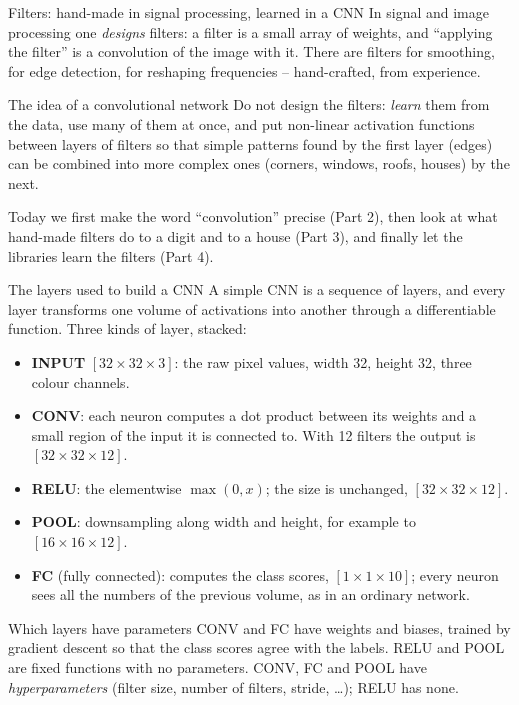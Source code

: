 \documentclass[10pt,aspectratio=169]{beamer}
\begin{document}
\begin{frame}{Filters: hand-made in signal processing, learned in a CNN}
\small
In signal and image processing one \emph{designs} filters: a filter is a
small array of weights, and ``applying the filter'' is a convolution of the
image with it.  There are filters for smoothing, for edge detection, for
reshaping frequencies -- hand-crafted, from experience.

\medskip
\begin{block}{The idea of a convolutional network}
Do not design the filters: \emph{learn} them from the data, use many of
them at once, and put non-linear activation functions between layers of
filters so that simple patterns found by the first layer (edges) can be
combined into more complex ones (corners, windows, roofs, houses) by the
next.
\end{block}

\medskip
Today we first make the word ``convolution'' precise (Part 2), then look at
what hand-made filters do to a digit and to a house (Part 3), and finally
let the libraries learn the filters (Part 4).
\end{frame}

\begin{frame}{The layers used to build a CNN}
\small
A simple CNN is a sequence of layers, and every layer transforms one volume
of activations into another through a differentiable function.  Three kinds
of layer, stacked:
\begin{itemize}
  \item \textbf{INPUT} $[32\times32\times3]$: the raw pixel values, width
        32, height 32, three colour channels.
  \item \textbf{CONV}: each neuron computes a dot product between its
        weights and a small region of the input it is connected to.  With
        12 filters the output is $[32\times32\times12]$.
  \item \textbf{RELU}: the elementwise $\max(0,x)$; the size is unchanged,
        $[32\times32\times12]$.
  \item \textbf{POOL}: downsampling along width and height, for example to
        $[16\times16\times12]$.
  \item \textbf{FC} (fully connected): computes the class scores,
        $[1\times1\times10]$; every neuron sees all the numbers of the
        previous volume, as in an ordinary network.
\end{itemize}
\begin{block}{Which layers have parameters}
CONV and FC have weights and biases, trained by gradient descent so that
the class scores agree with the labels.  RELU and POOL are fixed functions
with no parameters.  CONV, FC and POOL have \emph{hyperparameters} (filter
size, number of filters, stride, \dots); RELU has none.
\end{block}
\end{frame}
\end{document}

